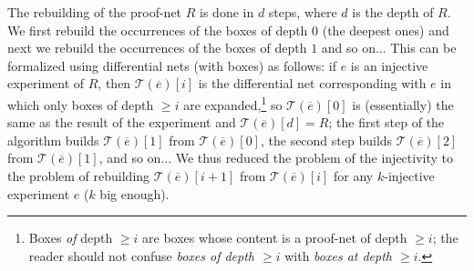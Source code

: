\documentclass{article}
\theoremstyle{plain}
\newcommand{\taylor}[2]{\mathcal{T}(#1)[#2]}
\begin{document}
The rebuilding of the proof-net $R$ is done in $d$ steps, where $d$ is the depth of $R$. We first rebuild the occurrences of the boxes of depth $0$ 
(the deepest ones) and next we rebuild the occurrences of the boxes of depth $1$ 
and so on... This can be formalized using differential nets (with boxes) as follows: if $e$ is an injective experiment of $R$, then $\taylor{\overline{e}}{i}$ is the differential net corresponding with $e$ in which only boxes of depth $\geq i$ are expanded,\footnote{Boxes \emph{of} depth $\geq i$ are boxes whose content is a proof-net of depth $\geq i$; the reader should not confuse \emph{boxes of depth $\geq i$} with \emph{boxes at depth $\geq i$}.} so $\taylor{\overline{e}}{0}$ is (essentially) the same as the result of the experiment and $\taylor{\overline{e}}{d} = R$; the first step of the algorithm builds $\taylor{\overline{e}}{1}$ from $\taylor{\overline{e}}{0}$, the second step builds $\taylor{\overline{e}}{2}$ from $\taylor{\overline{e}}{1}$, and so on... We thus reduced the problem of the injectivity to the problem of rebuilding $\taylor{\overline{e}}{i+1}$ from $\taylor{\overline{e}}{i}$ for any $k$-injective experiment $e$ ($k$ big enough).
\begin{comment}
The algorithm building $\taylor{\overline{e}}{i+1}$ from $\taylor{\overline{e}}{i}$ is presented in Definitions~\ref{defin: the algorithm (a)} and \ref{defin: the algorithm (b)}. Lemma~\ref{lem: we have an algorithm} states that:
\begin{itemize}
\item we do not cheat, i.e. we never use the names of the ports of $\taylor{\overline{e}}{i}$;\item and the algorithm is deterministic: at each step we can obtain only one differential net with boxes (up to the names of the ports), so, eventually, only one proof-net.
\end{itemize}
\end{comment}
\end{document}
